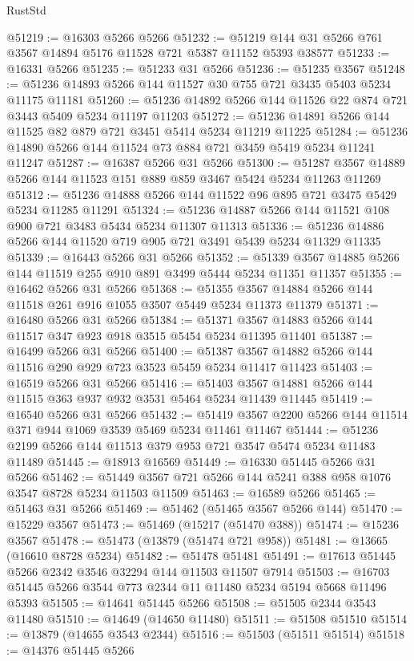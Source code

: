 \begin{lexlean}{RustStd}
\begin{coremodule}
@51219 := @16303 @5266 @5266
@51232 := @51219 @144 @31 @5266 @761 @3567 @14894 @5176 @11528 @721 @5387 @11152 @5393 @38577
@51233 := @16331 @5266
@51235 := @51233 @31 @5266
@51236 := @51235 @3567
@51248 := @51236 @14893 @5266 @144 @11527 @30 @755 @721 @3435 @5403 @5234 @11175 @11181
@51260 := @51236 @14892 @5266 @144 @11526 @22 @874 @721 @3443 @5409 @5234 @11197 @11203
@51272 := @51236 @14891 @5266 @144 @11525 @82 @879 @721 @3451 @5414 @5234 @11219 @11225
@51284 := @51236 @14890 @5266 @144 @11524 @73 @884 @721 @3459 @5419 @5234 @11241 @11247
@51287 := @16387 @5266 @31 @5266
@51300 := @51287 @3567 @14889 @5266 @144 @11523 @151 @889 @859 @3467 @5424 @5234 @11263 @11269
@51312 := @51236 @14888 @5266 @144 @11522 @96 @895 @721 @3475 @5429 @5234 @11285 @11291
@51324 := @51236 @14887 @5266 @144 @11521 @108 @900 @721 @3483 @5434 @5234 @11307 @11313
@51336 := @51236 @14886 @5266 @144 @11520 @719 @905 @721 @3491 @5439 @5234 @11329 @11335
@51339 := @16443 @5266 @31 @5266
@51352 := @51339 @3567 @14885 @5266 @144 @11519 @255 @910 @891 @3499 @5444 @5234 @11351 @11357
@51355 := @16462 @5266 @31 @5266
@51368 := @51355 @3567 @14884 @5266 @144 @11518 @261 @916 @1055 @3507 @5449 @5234 @11373 @11379
@51371 := @16480 @5266 @31 @5266
@51384 := @51371 @3567 @14883 @5266 @144 @11517 @347 @923 @918 @3515 @5454 @5234 @11395 @11401
@51387 := @16499 @5266 @31 @5266
@51400 := @51387 @3567 @14882 @5266 @144 @11516 @290 @929 @723 @3523 @5459 @5234 @11417 @11423
@51403 := @16519 @5266 @31 @5266
@51416 := @51403 @3567 @14881 @5266 @144 @11515 @363 @937 @932 @3531 @5464 @5234 @11439 @11445
@51419 := @16540 @5266 @31 @5266
@51432 := @51419 @3567 @2200 @5266 @144 @11514 @371 @944 @1069 @3539 @5469 @5234 @11461 @11467
@51444 := @51236 @2199 @5266 @144 @11513 @379 @953 @721 @3547 @5474 @5234 @11483 @11489
@51445 := @18913 @16569
@51449 := @16330 @51445 @5266 @31 @5266
@51462 := @51449 @3567 @721 @5266 @144 @5241 @388 @958 @1076 @3547 @8728 @5234 @11503 @11509
@51463 := @16589 @5266
@51465 := @51463 @31 @5266
@51469 := @51462 (@51465 @3567 @5266 @144)
@51470 := @15229 @3567
@51473 := @51469 (@15217 (@51470 @388))
@51474 := @15236 @3567
@51478 := @51473 (@13879 (@51474 @721 @958))
@51481 := @13665 (@16610 @8728 @5234)
@51482 := @51478 @51481
@51491 := @17613 @51445 @5266 @2342 @3546 @32294 @144 @11503 @11507 @7914
@51503 := @16703 @51445 @5266 @3544 @773 @2344 @11 @11480 @5234 @5194 @5668 @11496 @5393
@51505 := @14641 @51445 @5266
@51508 := @51505 @2344 @3543 @11480
@51510 := @14649 (@14650 @11480)
@51511 := @51508 @51510
@51514 := @13879 (@14655 @3543 @2344)
@51516 := @51503 (@51511 @51514)
@51518 := @14376 @51445 @5266

\end{coremodule}
\end{lexlean}

